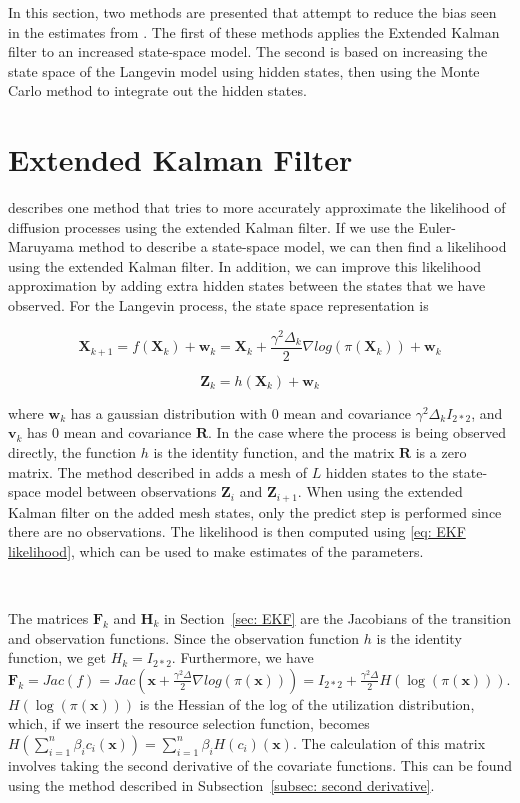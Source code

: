
\label{chap: methods}
In this section, two methods are presented that attempt to reduce the bias seen in the estimates from \cite{michelot_langevin_2019}. The first of these methods applies the Extended Kalman filter to an increased state-space model. The second is based on increasing the state space of the Langevin model using hidden states, then using the Monte Carlo method to integrate out the hidden states. 

\section{Extended Kalman Filter}
\parencite{kulikov_extended_2024} describes one method that tries to more accurately approximate the likelihood of diffusion processes using the extended Kalman filter. If we use the Euler-Maruyama method to describe a state-space model, we can then find a likelihood using the extended Kalman filter. In addition, we can improve this likelihood approximation by adding extra hidden states between the states that we have observed. For the Langevin process, the state space representation is 

$$\textbf{X}_{k+1} = f(\textbf{X}_k) + \textbf{w}_k = \textbf{X}_k + \frac{\gamma^2\Delta_k}{2}\nabla log(\pi(\textbf{X}_k)) + \textbf{w}_k$$

$$\textbf{Z}_k = h(\textbf{X}_k) + \textbf{w}_k$$

where $\textbf{w}_k$ has a gaussian distribution with $0$ mean and covariance $\gamma^2\Delta_k I_{2*2}$, and $\textbf{v}_k$ has $0$ mean and covariance $\textbf{R}$. In the case where the process is being observed directly, the function $h$ is the identity function, and the matrix $\textbf{R}$ is a zero matrix. The method described in \parencite{kulikov_extended_2024} adds a mesh of $L$ hidden states to the state-space model between observations $\textbf{Z}_i$ and $\textbf{Z}_{i+1}$. When using the extended Kalman filter on the added mesh states, only the predict step is performed since there are no observations. The likelihood is then computed using \eqref{eq: EKF likelihood}, which can be used to make estimates of the parameters. 

\

The matrices $\textbf{F}_k$ and $\textbf{H}_k$ in Section~\ref{sec: EKF} are the Jacobians of the transition and observation functions. Since the observation function $h$ is the identity function, we get $H_k = I_{2*2}$. Furthermore, we have $\textbf{F}_k = Jac(f) = Jac(\textbf{x} + \frac{\gamma^2 \Delta}{2}\nabla log(\pi(\textbf{x}))) = I_{2*2} + \frac{\gamma^2 \Delta}{2} H(\log(\pi(\textbf{x})))$. $H(\log(\pi(\textbf{x})))$ is the Hessian of the log of the utilization distribution, which, if we insert the resource selection function, becomes $H(\sum_{i=1}^n \beta_i c_i(\textbf{x})) = \sum_{i=1}^n \beta_iH( c_i)(\textbf{x})$. The calculation of this matrix involves taking the second derivative of the covariate functions. This can be found using the method described in Subsection~\ref{subsec: second derivative}.


